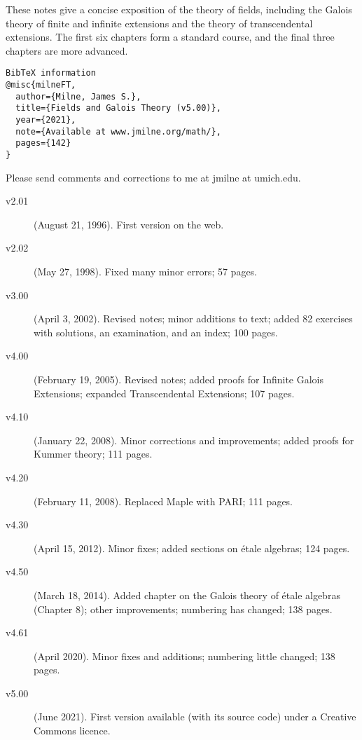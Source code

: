 \documentclass[a4paper,11pt,final,openany]{memoir}
\theoremstyle{nonumberplain}
\begin{document}
\vspace*{0.1in} \noindent These
notes give a concise exposition of the theory of fields, including the Galois
theory of finite and infinite extensions and the theory of transcendental
extensions. The first six chapters form a standard course, and the final three
chapters are more advanced.\vfill

\begin{verbatim}
BibTeX information
@misc{milneFT,
  author={Milne, James S.},
  title={Fields and Galois Theory (v5.00)},
  year={2021},
  note={Available at www.jmilne.org/math/},
  pages={142}
}
\end{verbatim}

\vfill

\noindent Please send comments and corrections to me at jmilne at umich.edu.
\begin{description}
\item[v2.01] (August 21, 1996). First version on the web.

\item[v2.02] (May 27, 1998). Fixed many minor errors; 57 pages.

\item[v3.00] (April 3, 2002). Revised notes; minor additions to text; added 82
exercises with solutions, an examination, and an index; 100 pages.

\item[v4.00] (February 19, 2005). Revised notes; added proofs for Infinite
Galois Extensions; expanded Transcendental Extensions; 107 pages.

\item[v4.10] (January 22, 2008). Minor corrections and improvements; added
proofs for Kummer theory; 111 pages.

\item[v4.20] (February 11, 2008). Replaced Maple with PARI; 111 pages.

\item[v4.30] (April 15, 2012). Minor fixes; added sections on \'etale
algebras; 124 pages.

\item[v4.50] (March 18, 2014). Added chapter on the Galois theory of \'etale
algebras (Chapter 8); other improvements; numbering has changed; 138 pages.

\item[v4.61] (April 2020). Minor fixes and additions; numbering little
changed; 138 pages.

\item[v5.00] (June 2021). First version available (with its source code) under a Creative Commons licence.
\end{description}
\end{document}
